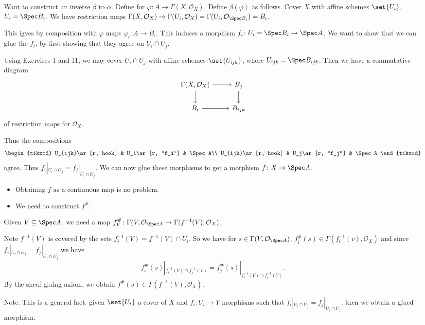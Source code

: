 Want to construct an inverse $\beta$ to $\alpha$. Define for
$\varphi\colon A\to \Gamma(X, \mathcal{O}_X)$. Define $\beta(\varphi)$ as follows.
Cover $X$ with affine schemes $\set{U_i}$,  $U_i = \Spec B_i$. We have
restriction maps $\Gamma(X, \mathcal{O}_X) \to \Gamma(U_i, \mathcal{O}_X) = \Gamma(U_i, \mathcal{O}_{\Spec B_i}) = B_i$.

This igves by composition with $\varphi$ maps $\varphi_i\colon A\to B_i$. This
induces a morphism $f_i\colon U_i = \Spec B_i \to \Spec A$. We want
to show that we can glue the $f_i$, by first showing that they agree on $U_i\cap U_j$.

Using Exercises 1 and 11, we may cover $U_i\cap U_j$ with affine schemes $\set{U_{ijk}}$,
where $U_{ijk} = \Spec B_{ijk}$. Then we have a commutative diagram
\[\begin{tikzcd}
	\Gamma(X, \mathcal{O}_X)\ar[r]\ar[d] & B_j\ar[d]\\
	B_i\ar[r] & B_{ijk}
\end{tikzcd}\]
of restriction maps for $\mathcal{O}_X$.

Thus the compositions
\[\begin{tikzcd}
	U_{ijk}\ar[r, hook] & U_i\ar[r, "f_i"] & \Spec A\\
	U_{ijk}\ar[r, hook] & U_j\ar[r, "f_j"] & \Spec A
\end{tikzcd}\]
agree. Thus $f_i|_{U_i\cap U_j} = f_j|_{U_i\cap U_j}$.
We can now glue these morphisms to get a morphism $f\colon X\to \Spec A$.
\begin{itemize}
	\item Obtaining $f$ as a continuous map is no problem.
	\item We need to construct $f^\#$.
\end{itemize}
Given $V \subseteq \Spec A$, we need a map $f^\#_V\colon \Gamma(V, \mathcal{O}_{\Spec A}\to \Gamma(f^{-1}(V), \mathcal{O}_X)$.

Note $f^{-1}(V)$ is covered by the sets $f_i^{-1}(V) = f^{-1}(V) \cap U_i$. So we have for
$s \in \Gamma(V, \mathcal{O}_{\Spec A})$, $f_i^\#(s) \in \Gamma(f^{-1}_i(v), \mathcal{O}_X)$
and since $f_i|_{U_i\cap U_j} = f_j|_{U_i\cap U_j}$ we have
\[f_i^\#(s)|_{f_i^{-1}(V)\cap f_j^{-1}(V)} = f_j^\#(s)|_{f_i^{-1}(V)\cap f_j^{-1}(V)}. \]
By the sheaf gluing axiom, we obtain $f^\#(s) \in \Gamma(f^{-1}(V), \mathcal{O}_X)$.

Note: This is a general fact: given $\set{U_i}$ a cover of $X$ and $f_i\colon U_i\to Y$ morphisms
such that $f_i|_{U_i\cap U_j} = f_j|_{U_i\cap U_j}$, then we obtain a glued morphism.

